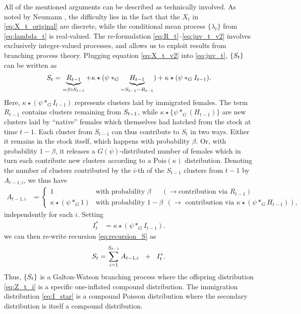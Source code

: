 \documentclass{article}
\begin{document}
All of the mentioned arguments can be described as technically involved. As noted by Neumann \cite{Neumann2011}, the difficulty lies in the fact that the $X_t$ in \eqref{eq:X_t_original} are discrete, while the conditional mean process $\{\lambda_t\}$ from \eqref{eq:lambda_t} is real-valued. The re-formulation \eqref{eq:R_t}--\eqref{eq:juv_t_v2} involves exclusively integer-valued processes, and allows us to exploit results from branching process theory. Plugging equation \eqref{eq:X_t_v2} into \eqref{eq:juv_t}, $\{S_t\}$ can be written as
\begin{align}
S_t = \underbrace{R_{t - 1}}_{= \beta \circ S_{t - 1}} + \kappa \star (\psi *_G \underbrace{H_{t - 1}}_{ = S_{t - 1} - R_{t - 1}}) + \kappa \star (\psi *_G I_{t - 1}). \label{eq:recursion_S}
\end{align}
Here, $\kappa \star (\psi *_G I_{t - 1})$ represents clusters laid by immigrated females. The term  $R_{t - 1}$ contains clusters remaining from $ S_{t - 1}$, while $\kappa \star \{\psi *_G (H_{t - 1})\}$ are new clusters laid by ``native'' females which themselves had hatched from the stock at time $t - 1$. Each cluster from $S_{t - 1}$ can thus contribute to $S_t$ in two ways. Either it remains in the stock itself, which happens with probability $\beta$. Or, with probability $1 - \beta$, it releases a $G(\psi)$-distributed number of females which in turn each contribute new clusters according to a $\text{Pois}(\kappa)$ distribution. Denoting the number of clusters contributed by the $i$-th of the $S_{t - 1}$ clusters from $t - 1$ by $A_{t - 1, i}$, we thus have
\begin{align}
A_{t - 1, i} & = \begin{cases}
1 & \text{with probability } \beta \ \ \ \ \ \ \ (\rightarrow \text{contribution via } R_{t - 1}) \\
\kappa \star (\psi *_G 1) & \text{with probability } 1 - \beta \ \ (\rightarrow \text{ contribution via } \kappa \star (\psi *_G H_{t - 1})),
\label{eq:Z_t_i}
\end{cases}
\end{align}
independently for each $i$. Setting
\begin{align}
I^*_t & = \kappa\star (\psi *_G I_{t - 1}). \label{eq:I_star}
\end{align}
we can then re-write recursion \eqref{eq:recursion_S} as
$$
S_t = \sum_{i = 1}^{S_{t - 1}} A_{t - 1, i} \ \ + \ \ I^*_t.
$$
Thus, $\{S_t\}$ is a Galton-Watson branching process where the offspring distribution \eqref{eq:Z_t_i} is a specific one-inflated compound distribution. %
The immigration distribution \eqref{eq:I_star} is a compound Poisson distribution where the secondary distribution is itself a compound distribution. %
\end{document}
